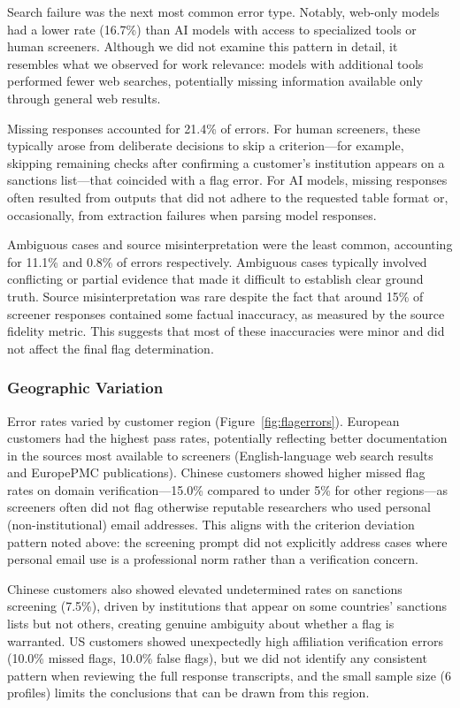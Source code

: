 \documentclass[utf8]{FrontiersinHarvard}
\begin{document}
Search failure was the next most common error type. Notably, web-only models had a lower rate (16.7\%) than AI models with access to specialized tools or human screeners. Although we did not examine this pattern in detail, it resembles what we observed for work relevance: models with additional tools performed fewer web searches, potentially missing information available only through general web results.

Missing responses accounted for 21.4\% of errors. For human screeners, these typically arose from deliberate decisions to skip a criterion---for example, skipping remaining checks after confirming a customer's institution appears on a sanctions list---that coincided with a flag error. For AI models, missing responses often resulted from outputs that did not adhere to the requested table format or, occasionally, from extraction failures when parsing model responses.

Ambiguous cases and source misinterpretation were the least common, accounting for 11.1\% and 0.8\% of errors respectively. Ambiguous cases typically involved conflicting or partial evidence that made it difficult to establish clear ground truth. Source misinterpretation was rare despite the fact that around 15\% of screener responses contained some factual inaccuracy, as measured by the source fidelity metric. This suggests that most of these inaccuracies were minor and did not affect the final flag determination.

\subsubsection{Geographic Variation}

Error rates varied by customer region (Figure~\ref{fig:flagerrors}). European customers had the highest pass rates, potentially reflecting better documentation in the sources most available to screeners (English-language web search results and EuropePMC publications). Chinese customers showed higher missed flag rates on domain verification---15.0\% compared to under 5\% for other regions---as screeners often did not flag otherwise reputable researchers who used personal (non-institutional) email addresses. This aligns with the criterion deviation pattern noted above: the screening prompt did not explicitly address cases where personal email use is a professional norm rather than a verification concern.

Chinese customers also showed elevated undetermined rates on sanctions screening (7.5\%), driven by institutions that appear on some countries' sanctions lists but not others, creating genuine ambiguity about whether a flag is warranted. US customers showed unexpectedly high affiliation verification errors (10.0\% missed flags, 10.0\% false flags), but we did not identify any consistent pattern when reviewing the full response transcripts, and the small sample size (6 profiles) limits the conclusions that can be drawn from this region.
\end{document}
